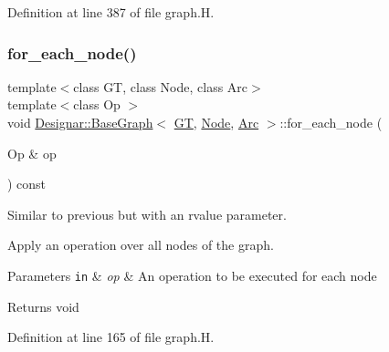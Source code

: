 Definition at line 387 of file graph.\+H.

\mbox{\label{class_designar_1_1_base_graph_a9497531ac221edb5c5ef19888f78ad3c}} 
\subsubsection{\texorpdfstring{for\+\_\+each\+\_\+node()}{for\_each\_node()}\hspace{0.1cm}{\footnotesize\ttfamily [1/2]}}
{\footnotesize\ttfamily template$<$class GT, class Node, class Arc$>$ \\
template$<$class Op $>$ \\
void \hyperlink{class_designar_1_1_base_graph}{Designar\+::\+Base\+Graph}$<$ \hyperlink{demo-buildgraph_8_c_a3001c40d2c31ca87ed96cd7d1334a55e}{GT}, \hyperlink{namespace_designar_a5af326c65aa2bd26b26c410f2030d09e}{Node}, \hyperlink{namespace_designar_a3f55fb5513d62ff47cbc8f72b8e95d6f}{Arc} $>$\+::for\+\_\+each\+\_\+node (\begin{DoxyParamCaption}\item[{Op \&}]{op }\end{DoxyParamCaption}) const\hspace{0.3cm}{\ttfamily [inline]}}



Similar to previous but with an rvalue parameter. 

Apply an operation over all nodes of the graph.


\begin{DoxyParams}[1]{Parameters}
\mbox{\tt in}  & {\em op} & An operation to be executed for each node \\
\hline
\end{DoxyParams}
\begin{DoxyReturn}{Returns}
void 
\end{DoxyReturn}


Definition at line 165 of file graph.\+H.

\mbox{\label{class_designar_1_1_base_graph_aab8f765719514803f426b03939f519a1}} 
